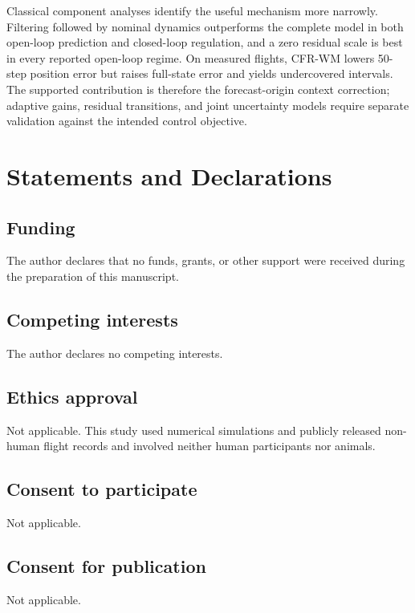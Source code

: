 \documentclass[pdflatex,sn-basic]{sn-jnl}
\begin{document}
Classical component analyses identify the useful mechanism more narrowly.
Filtering followed by nominal dynamics outperforms the complete model in both
open-loop prediction and closed-loop regulation, and a zero residual scale is
best in every reported open-loop regime. On measured flights, CFR-WM lowers
50-step position error but raises full-state error and yields undercovered
intervals. The supported contribution is therefore the forecast-origin
context correction; adaptive gains, residual transitions, and joint
uncertainty models require separate validation against the intended control
objective.

\backmatter
\section*{Statements and Declarations}

\subsection*{Funding}
The author declares that no funds, grants, or other support were received
during the preparation of this manuscript.

\subsection*{Competing interests}
The author declares no competing interests.

\subsection*{Ethics approval}
Not applicable. This study used numerical simulations and publicly released
non-human flight records and involved neither human participants nor animals.

\subsection*{Consent to participate}
Not applicable.

\subsection*{Consent for publication}
Not applicable.
\end{document}

